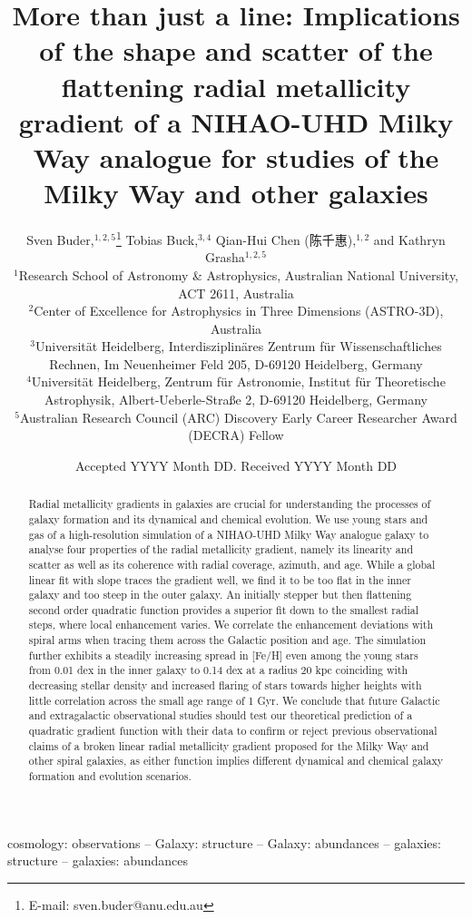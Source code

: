 \documentclass[fleqn,usenatbib]{mnras}
\title[Radial metallicity gradients in NIHAO-UHD]{More than just a line: Implications of the shape and scatter of the flattening radial metallicity gradient of a NIHAO-UHD Milky Way analogue for studies of the Milky Way and other galaxies}
\author[S. Buder et al.]{
Sven Buder,$^{1,2,5}$\thanks{E-mail: sven.buder@anu.edu.au}
Tobias Buck,$^{3,4}$
Qian-Hui Chen (陈千惠),$^{1,2}$ and
Kathryn Grasha$^{1,2,5}$
\\
$^{1}$Research School of Astronomy \& Astrophysics, Australian National University, ACT 2611, Australia\\
$^{2}$Center of Excellence for Astrophysics in Three Dimensions (ASTRO-3D), Australia\\
$^{3}$Universit{\"a}t Heidelberg, Interdisziplin{\"a}res Zentrum f{\"u}r Wissenschaftliches Rechnen, Im Neuenheimer Feld 205, D-69120 Heidelberg, Germany\\
$^{4}$Universit{\"a}t Heidelberg, Zentrum f{\"u}r Astronomie, Institut f{\"u}r Theoretische Astrophysik, Albert-Ueberle-Straße 2, D-69120 Heidelberg, Germany\\
$^{5}$Australian Research Council (ARC) Discovery Early Career Researcher Award (DECRA) Fellow
}
\date{Accepted YYYY Month DD. Received YYYY Month DD}
\begin{document}
\label{firstpage}
\pagerange{\pageref{firstpage}--\pageref{lastpage}}
\begin{CJK}{UTF8}{gbsn}
\maketitle
\end{CJK}

\begin{abstract} %
Radial metallicity gradients in galaxies are crucial for understanding the processes of galaxy formation and its dynamical and chemical evolution.
We use young stars and gas of a high-resolution simulation of a NIHAO-UHD Milky Way analogue galaxy to analyse four properties of the radial metallicity gradient, namely its linearity and scatter as well as its coherence with radial coverage, azimuth, and age.
While a global linear fit with slope traces the gradient well, we find it to be too flat in the inner galaxy and too steep in the outer galaxy. An initially stepper but then flattening second order quadratic function provides a superior fit down to the smallest radial steps, where local enhancement varies. We correlate the enhancement deviations with spiral arms when tracing them across the Galactic position and age. The simulation further exhibits a steadily increasing spread in [Fe/H] even among the young stars from 0.01 dex in the inner galaxy to 0.14 dex at a radius 20 kpc coinciding with decreasing stellar density and increased flaring of stars towards higher heights with little correlation across the small age range of 1 Gyr.
We conclude that future Galactic and extragalactic observational studies should test our theoretical prediction of a quadratic gradient function with their data to confirm or reject previous observational claims of a broken linear radial metallicity gradient proposed for the Milky Way and other spiral galaxies, as either function implies different dynamical and chemical galaxy formation and evolution scenarios.
\end{abstract}
\begin{keywords}
cosmology: observations -- Galaxy: structure -- Galaxy: abundances  -- galaxies: structure -- galaxies: abundances
\end{keywords}

\end{document}

